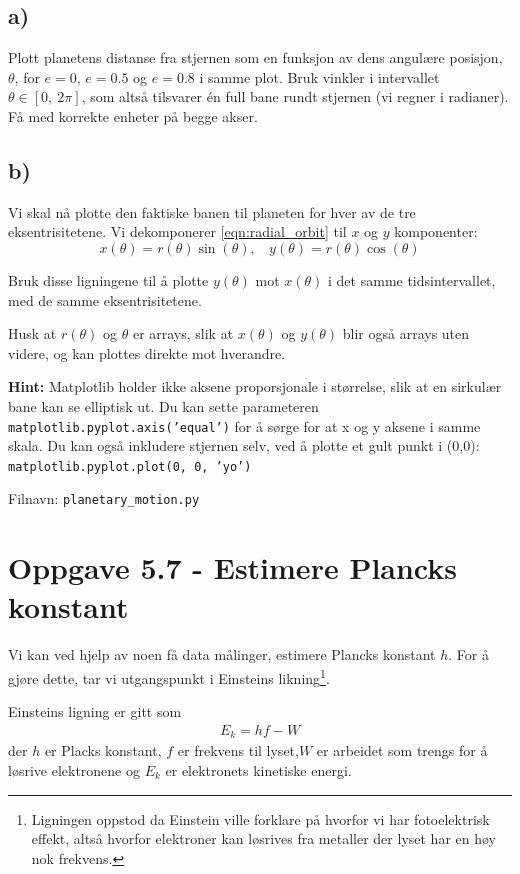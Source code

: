 \documentclass[10pt,a4paper]{article}
\begin{document}
\subsection*{a)}
Plott planetens distanse fra stjernen som en funksjon av dens angulære posisjon, $\theta$, for $e = 0$, $e=0.5$ og $e=0.8$ i samme plot. Bruk vinkler i intervallet $\theta \in [0,\ 2\pi]$, som altså tilsvarer én full bane rundt stjernen (vi regner i radianer). Få med korrekte enheter på begge akser.


\subsection*{b)}
Vi skal nå plotte den faktiske banen til planeten for hver av de tre eksentrisitetene. Vi dekomponerer \ref{eqn:radial_orbit} til $x$ og $y$ komponenter:
\[	x(\theta) = r(\theta)\sin(\theta),\ \ \ \ y(\theta) = r(\theta)\cos(\theta)
\]

Bruk disse ligningene til å plotte $y(\theta)$ mot $x(\theta)$ i det samme tidsintervallet, med de samme eksentrisitetene.

Husk at $r(\theta)$ og $\theta$ er arrays, slik at $x(\theta)$ og $y(\theta)$ blir også arrays uten videre, og kan plottes direkte mot hverandre.

\textbf{Hint:} Matplotlib holder ikke aksene proporsjonale i størrelse, slik at en sirkulær bane kan se elliptisk ut. Du kan sette parameteren \texttt{matplotlib.pyplot.axis('equal')} for å sørge for at x og y aksene i samme skala.
Du kan også inkludere stjernen selv, ved å plotte et gult punkt i (0,0): \texttt{matplotlib.pyplot.plot(0, 0, 'yo')}


Filnavn: \texttt{planetary\_motion.py}




\section*{Oppgave 5.7 - Estimere Plancks konstant}
Vi kan ved hjelp av noen få data målinger, estimere Plancks konstant $h$. For å gjøre dette, tar vi utgangspunkt i Einsteins likning\footnote{Ligningen oppstod da Einstein ville forklare på hvorfor vi har fotoelektrisk effekt, altså hvorfor elektroner kan løsrives fra metaller der lyset har en høy nok frekvens. }.

Einsteins ligning er gitt som
\begin{align*}
	E_k = hf - W
\end{align*}
der $h$ er Placks konstant, $f$ er frekvens til lyset,$W$ er arbeidet som trengs for å løsrive elektronene og $E_k$ er elektronets kinetiske energi.
\end{document}
